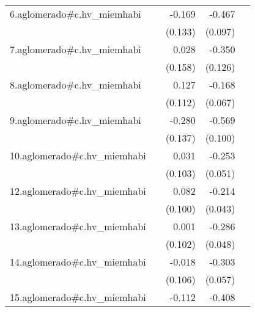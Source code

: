 {\begin{longtable}{l*{4}{D{.}{.}{-1}}}
\addlinespace
6.aglomerado#c.hv\_miemhabi&                     &      -0.169         &      -0.467\sym{***}&                     \\
            &                     &     (0.133)         &     (0.097)         &                     \\
\addlinespace
7.aglomerado#c.hv\_miemhabi&                     &       0.028         &      -0.350\sym{**} &                     \\
            &                     &     (0.158)         &     (0.126)         &                     \\
\addlinespace
8.aglomerado#c.hv\_miemhabi&                     &       0.127         &      -0.168\sym{*}  &                     \\
            &                     &     (0.112)         &     (0.067)         &                     \\
\addlinespace
9.aglomerado#c.hv\_miemhabi&                     &      -0.280\sym{*}  &      -0.569\sym{***}&                     \\
            &                     &     (0.137)         &     (0.100)         &                     \\
\addlinespace
10.aglomerado#c.hv\_miemhabi&                     &       0.031         &      -0.253\sym{***}&                     \\
            &                     &     (0.103)         &     (0.051)         &                     \\
\addlinespace
12.aglomerado#c.hv\_miemhabi&                     &       0.082         &      -0.214\sym{***}&                     \\
            &                     &     (0.100)         &     (0.043)         &                     \\
\addlinespace
13.aglomerado#c.hv\_miemhabi&                     &       0.001         &      -0.286\sym{***}&                     \\
            &                     &     (0.102)         &     (0.048)         &                     \\
\addlinespace
14.aglomerado#c.hv\_miemhabi&                     &      -0.018         &      -0.303\sym{***}&                     \\
            &                     &     (0.106)         &     (0.057)         &                     \\
\addlinespace
15.aglomerado#c.hv\_miemhabi&                     &      -0.112         &      -0.408\sym{***}&                     \\

\end{longtable}}
